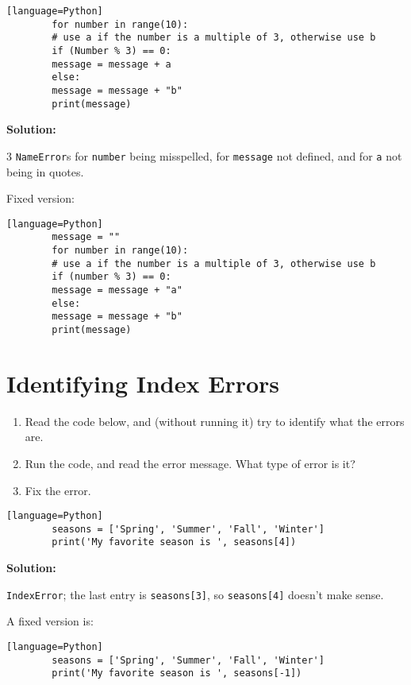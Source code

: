 \documentclass{article}
\begin{document}
	\begin{verbatim}[language=Python]
		for number in range(10):
		# use a if the number is a multiple of 3, otherwise use b
		if (Number % 3) == 0:
		message = message + a
		else:
		message = message + "b"
		print(message)
	\end{verbatim}
	
	\textbf{Solution:}
	
	3 \texttt{NameError}s for \texttt{number} being misspelled, for \texttt{message} not defined, and for \texttt{a} not being in quotes.
	
	Fixed version:
	
	\begin{verbatim}[language=Python]
		message = ""
		for number in range(10):
		# use a if the number is a multiple of 3, otherwise use b
		if (number % 3) == 0:
		message = message + "a"
		else:
		message = message + "b"
		print(message)
	\end{verbatim}
	
	\section{Identifying Index Errors}
	
	\begin{enumerate}
		\item Read the code below, and (without running it) try to identify what the errors are.
		\item Run the code, and read the error message. What type of error is it?
		\item Fix the error.
	\end{enumerate}
	
	\begin{verbatim}[language=Python]
		seasons = ['Spring', 'Summer', 'Fall', 'Winter']
		print('My favorite season is ', seasons[4])
	\end{verbatim}
	
	\textbf{Solution:}
	
	\texttt{IndexError}; the last entry is \texttt{seasons[3]}, so \texttt{seasons[4]} doesn't make sense.
	
	A fixed version is:
	
	\begin{verbatim}[language=Python]
		seasons = ['Spring', 'Summer', 'Fall', 'Winter']
		print('My favorite season is ', seasons[-1])
	\end{verbatim}
	
	
\end{document}
